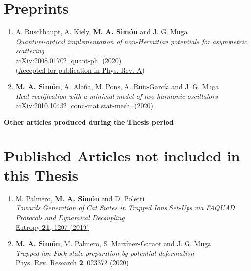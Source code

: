 \section*{Preprints}

\begin{enumerate}

  \item A. Ruschhaupt, A. Kiely, {\bf M. A. Sim\'{o}n} and J. G. Muga\\
  {\it Quantum-optical implementation of non-Hermitian potentials for asymmetric scattering}\\
  \href{https://arxiv.org/abs/2008.01702}{arXiv:2008.01702 [quant-ph] (2020)}\\
  (\href{https://journals.aps.org/pra/accepted/2f07eYb5Ibe1ea6603ef59232d2f3864c12b1a62d}{Accepted for publication in Phys. Rev. A})

  \item {\bf M. A. Sim\'{o}n}, A. Alaña, M. Pons, A. Ruiz-Garc\'{i}a and J. G. Muga\\
  {\it Heat rectification with a minimal model of two harmonic oscillators}\\
  \href{https://arxiv.org/abs/2010.10432}{arXiv:2010.10432 [cond-mat.stat-mech] (2020)}

\end{enumerate}

\vspace{1.25 cm}

 {\bf Other articles produced during the Thesis period}
\section*{Published  Articles not included in this Thesis}

\begin{enumerate}

  \item M. Palmero, {\bf M. A. Sim\'{o}n} and D. Poletti\\
  {\it Towards Generation of Cat States in Trapped Ions Set-Ups via FAQUAD Protocols and Dynamical Decoupling}\\
  \href{https://doi.org/10.3390/e21121207}{Entropy {\bf 21}, 1207 (2019)}

  \item {\bf M. A. Sim\'{o}n}, M. Palmero, S. Mart\'{i}nez-Garaot and J. G. Muga\\
  {\it Trapped-ion Fock-state preparation by potential deformation}\\
  \href{https://doi.org/10.1103/PhysRevResearch.2.023372}{Phys. Rev. Research {\bf 2}, 023372 (2020)}

\end{enumerate}
